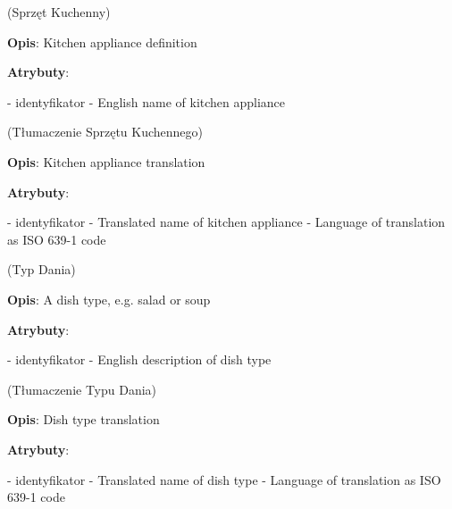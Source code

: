\begin{enumerate}[label={\textbf{KAT/\protect\threedigits{\theenumi}}}, wide, labelwidth=!, labelindent=0pt, labelsep=0pt, series=reqs]
     \label{kat:KitchenAppliance} (Sprzęt Kuchenny)

    \textbf{Opis}: Kitchen appliance definition
    \par
    \textbf{Atrybuty}:
    \begin{itemize}[series=atr, wide, align=left, leftmargin=190pt]
         \label{kat:KitchenAppliance:id} - identyfikator
         \label{kat:KitchenAppliance:name} - English name of kitchen appliance
    \end{itemize}

     \label{kat:KitchenApplianceTranslation} (Tłumaczenie Sprzętu Kuchennego)

    \textbf{Opis}: Kitchen appliance translation
    \par
    \textbf{Atrybuty}:
    \begin{itemize}[series=atr, wide, align=left, leftmargin=190pt]
         \label{kat:KitchenApplianceTranslation:id} - identyfikator
         \label{kat:KitchenApplianceTranslation:translation} - Translated name of kitchen appliance
         \label{kat:KitchenApplianceTranslation:language} - Language of translation as ISO 639-1 code
    \end{itemize}

     \label{kat:DishType} (Typ Dania)

    \textbf{Opis}: A dish type, e.g. salad or soup
    \par
    \textbf{Atrybuty}:
    \begin{itemize}[series=atr, wide, align=left, leftmargin=190pt]
         \label{kat:DishType:id} - identyfikator
         \label{kat:DishType:description} - English description of dish type
    \end{itemize}

     \label{kat:DishTypeTranslation} (Tłumaczenie Typu Dania)

    \textbf{Opis}: Dish type translation
    \par
    \textbf{Atrybuty}:
    \begin{itemize}[series=atr, wide, align=left, leftmargin=190pt]
         \label{kat:DishTypeTranslation:id} - identyfikator
         \label{kat:DishTypeTranslation:translation} - Translated name of dish type
         \label{kat:DishTypeTranslation:language} - Language of translation as ISO 639-1 code
    \end{itemize}


\end{enumerate}
